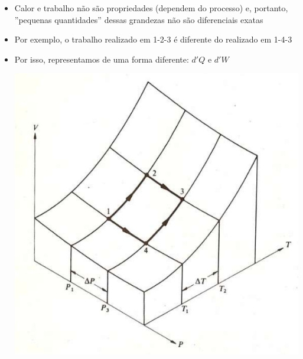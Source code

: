 \documentclass[t,%
brazilian,%
11pt,%
aspectratio=169,%
table%
]{beamer}
\begin{document}
\begin{frame}
    \begin{tcolorbox}[colback=red!10]
        \begin{itemize}
            \item Calor e trabalho não são propriedades (dependem do processo) e, portanto, ''pequenas quantidades''
                dessas grandezas não são diferenciais exatas
            \item Por exemplo, o trabalho realizado em 1-2-3 é diferente do realizado em 1-4-3
            \item Por isso, representamos de uma forma diferente: \(d'Q\) e \(d'W\)

                \centering
                \includegraphics[height=\textheight-88pt]{images/Captura de tela de 2023-04-26 08-27-55.png}
        \end{itemize}
    \end{tcolorbox}
\end{frame}
\end{document}

